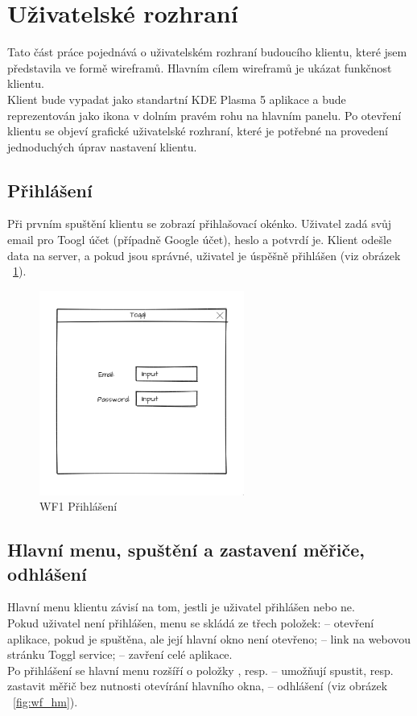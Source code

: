 \documentclass[thesis=B,czech]{FITthesis}[2012/06/26]
\begin{document}
\section{Uživatelské rozhraní}
Tato část práce pojednává o uživatelském rozhraní budoucího klientu, které jsem představila ve formě wireframů. Hlavním cílem wireframů je ukázat funkčnost klientu. \\
Klient bude vypadat jako standartní KDE Plasma 5 aplikace a bude reprezentován jako ikona v dolním pravém rohu na hlavním panelu. Po otevření klientu se objeví grafické uživatelské rozhraní, které je potřebné na provedení jednoduchých úprav nastavení klientu. 
\subsection{Přihlášení}
Při prvním spuštění klientu se zobrazí přihlašovací okénko. Uživatel zadá svůj email pro Toogl účet (případně Google účet), heslo a potvrdí je. Klient odešle data na server, a pokud jsou správné, uživatel je úspěšně přihlášen (viz obrázek ~\ref{fig:wf_login}). 

 \begin{figure}[h]\centering
	\includegraphics[width=0.6\textwidth]{wf_login.png}
	\caption[WF1 Přihlášení]{WF1 Přihlášení}\label{fig:wf_login}
\end{figure}



\subsection{Hlavní menu, spuštění a zastavení měřiče, odhlášení}

Hlavní menu klientu závisí na tom, jestli je uživatel přihlášen nebo ne.\\
Pokud uživatel není přihlášen, menu se skládá ze třech položek:  -- otevření aplikace, pokud je spuštěna, ale její hlavní okno není otevřeno;   -- link na webovou stránku Toggl service;  -- zavření celé aplikace.\\
Po přihlášení se hlavní menu rozšíří o položky , resp.  -- umožňují spustit, resp. zastavit měřič bez nutnosti otevírání hlavního okna,  -- odhlášení (viz obrázek ~\ref{fig:wf_hm}).
\end{document}
